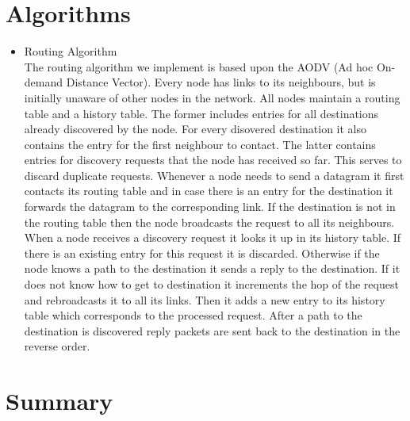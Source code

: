 \documentclass{article}
\begin{document}
\section{Algorithms}
\begin{itemize}
  \item Routing Algorithm\\
The routing algorithm we implement is based upon the AODV (Ad hoc On-demand
Distance Vector). Every node has links to its neighbours, but is initially
unaware of other nodes in the network. All nodes maintain a routing table 
and a history table. The former includes entries for all destinations already
 discovered by the node. For every disovered destination it also contains 
 the entry for the first neighbour to contact. The latter contains entries 
 for discovery requests that the node has received so far. This serves to 
 discard duplicate requests. Whenever a node needs to send a datagram it first 
 contacts its routing table and in case there is an entry for the destination
 it forwards the datagram to the corresponding link. If the destination is not
 in the routing table then the node broadcasts the request to all its
 neighbours. When a node receives a discovery request it looks it up in its
 history table. If there is an existing entry for this request it is discarded.
 Otherwise if the node knows a path to the destination it sends a reply to the
 destination. If it does not know how to get to destination it increments the hop
 of the request and rebroadcasts it to all its links. Then it adds a new entry to
 its history table which corresponds to the processed request. After a path to
 the destination is discovered reply packets are sent back to the destination
 in the reverse order.
 \end{itemize} 
\section{Summary}
\end{document}
